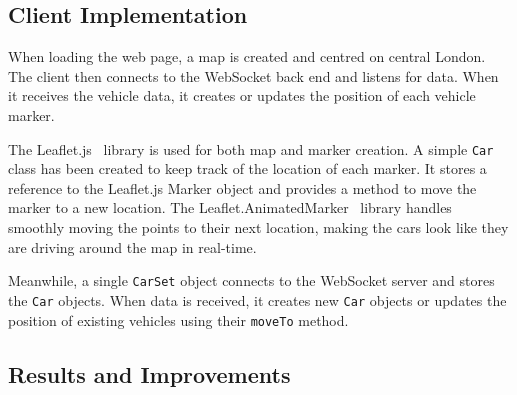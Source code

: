 \documentclass[ %
                    author={Alexander Hill},
                supervisor={Dr. Benjamin Sach},
                    degree={MEng},
                     title={MARMOSET},
                  subtitle={Multi-Agent Route Management using Online Simulation for Efficient Transportation},
                      type={research},
                      year={2016} ]{dissertation}
\begin{document}
\subsection{Client Implementation}

When loading the web page, a map is created and centred on central London.  The
client then connects to the WebSocket back end and listens for data. When it
receives the vehicle data, it creates or updates the position of each vehicle
marker.

The Leaflet.js~\cite{leaflet} library is used for both map and marker creation.
A simple \texttt{Car} class has been created to keep track of the location of
each marker. It stores a reference to the Leaflet.js Marker object and provides
a method to move the marker to a new location. The
Leaflet.AnimatedMarker~\cite{animarker} library handles smoothly moving the
points to their next location, making the cars look like they are driving around
the map in real-time.

Meanwhile, a single \texttt{CarSet} object connects to the WebSocket server and
stores the \texttt{Car} objects. When data is received, it creates new
\texttt{Car} objects or updates the position of existing vehicles using their
\texttt{moveTo} method.

\subsection{Results and Improvements}
\end{document}
